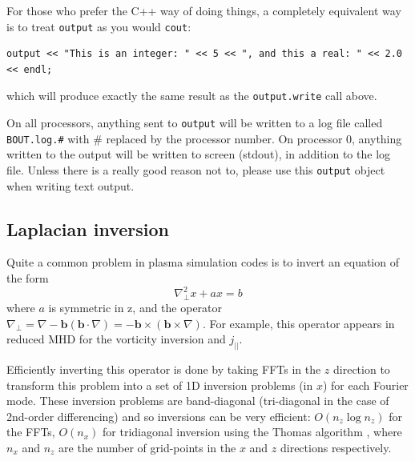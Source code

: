 \documentclass[12pt]{article}
\newcommand{\code}[1]{\texttt{#1}}
\begin{document}
For those who prefer the C++ way of doing things, a completely equivalent way is to
treat \code{output} as you would \code{cout}:
\begin{lstlisting}
output << "This is an integer: " << 5 << ", and this a real: " << 2.0 << endl;
\end{lstlisting}
which will produce exactly the same result as the \code{output.write} call above.

On all processors, anything sent to \code{output} will be written to a log file called
\texttt{BOUT.log.\#} with \# replaced by the processor number. On processor 0, anything
written to the output will be written to screen (stdout), in addition to the log file.
Unless there is a really good reason not to, please use this \code{output} object 
when writing text output.

\subsection{Laplacian inversion}
Quite a common problem in plasma simulation codes is to invert an equation of the form
\[
\nabla_\perp^2 x + a x = b
\]
where $a$ is symmetric in z, and the operator $\nabla_\perp = \nabla - \mathbf{b}\left(\mathbf{b}\cdot\nabla\right) = -\mathbf{b\times} \left(\mathbf{b\times}\nabla\right)$. For example, this operator
appears in reduced MHD for the vorticity inversion and $j_||$.

Efficiently inverting this operator is done by taking FFTs in the $z$ direction
to transform this problem into a set of 1D inversion problems (in $x$) for each Fourier mode.
These inversion problems are band-diagonal (tri-diagonal in the case of 2nd-order differencing) and so
inversions can be very efficient: $O\left(n_z \log n_z\right)$ for the FFTs, $O\left(n_x\right)$ for tridiagonal inversion
using the Thomas algorithm \cite{press-1999}, where $n_x$ and $n_z$ are the number of grid-points
in the $x$ and $z$ directions respectively.
\end{document}
